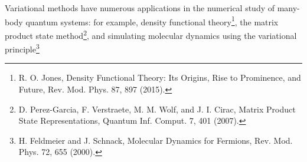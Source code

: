 \documentclass[11pt, oneside]{article}   	%
\begin{document}
Variational methods have numerous applications in the numerical study of many-body quantum systems: for example, 
density functional theory\footnote{R. O. Jones, Density Functional Theory: Its Origins, Rise to Prominence, and Future, Rev. Mod. Phys. 87, 897 (2015).}, 
the matrix product state method\footnote{D. Perez-Garcia, F. Verstraete, M. M. Wolf, and J. I. Cirac, Matrix Product State Representations, Quantum Inf. Comput. 7, 401 (2007).}, 
and simulating molecular dynamics using the variational principle\footnote{H. Feldmeier and J. Schnack, Molecular Dynamics for
Fermions, Rev. Mod. Phys. 72, 655 (2000).}
\end{document}
